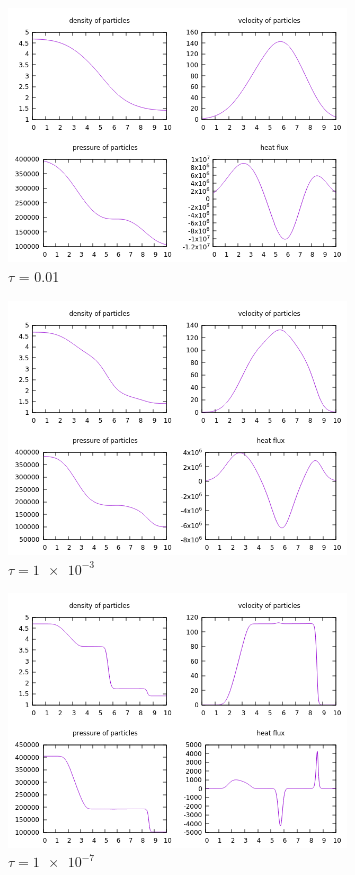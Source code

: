\documentclass[paper=a4, fontsize=12pt]{scrartcl}
\begin{document}
\begin{figure}[H]
        \centering
        \includegraphics[width=0.8\textwidth]{tau0-01}
        \caption{$\tau$ = 0.01}
        \label{fig:tau0-01}
\end{figure}
\begin{figure}[H]
        \centering
        \includegraphics[width=0.8\textwidth]{tau_1e-3}
        \caption{$\tau = \SI{1e-3}{} $}
        \label{fig:tau_1e-3}
\end{figure}
\begin{figure}[H]
        \centering
        \includegraphics[width=0.8\textwidth]{tau_1e-7}
        \caption{$\tau = \SI{1e-7}{}$ }
        \label{fig:tau_1e-7}
\end{figure}
\end{document}
